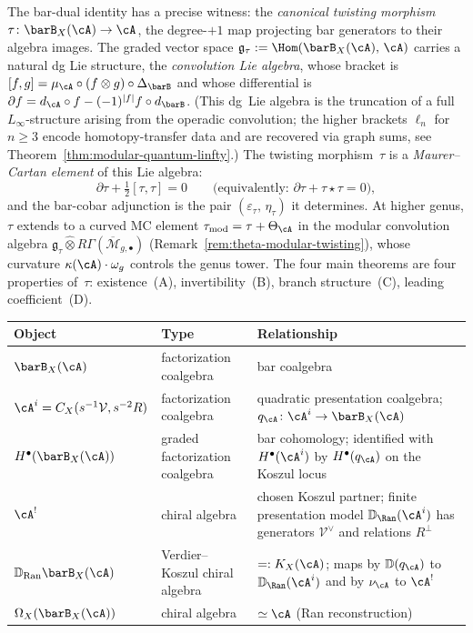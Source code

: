 \begin{convention}
The bar-dual identity has a precise witness: the \emph{canonical
twisting morphism}
$\tau \colon \barB_X(\cA) \to \cA$,
the degree-$+1$ map projecting bar generators to their algebra
images. The graded vector space
$\mathfrak{g}_\tau := \Hom(\barB_X(\cA),\, \cA)$ carries a
natural dg Lie structure, the \emph{convolution Lie algebra}, whose
bracket is $[f, g] = \mu_\cA \circ (f \otimes g) \circ
\Delta_{\barB}$ and whose differential is
$\partial f = d_\cA \circ f - (-1)^{|f|} f \circ d_{\barB}$.
(This dg~Lie algebra is the truncation of a full $L_\infty$-structure
arising from the operadic convolution; the higher brackets
$\ell_n$ for $n \ge 3$ encode homotopy-transfer data and are
recovered via graph sums, see
Theorem~\ref{thm:modular-quantum-linfty}.)
The twisting morphism~$\tau$ is a \emph{Maurer--Cartan element}
of this Lie algebra:
\[
\partial\tau + \tfrac{1}{2}[\tau, \tau] = 0
\qquad
\bigl(\text{equivalently: } \partial\tau + \tau \star \tau = 0\bigr),
\]
and the bar-cobar adjunction is the pair
$(\varepsilon_\tau,\, \eta_\tau)$ it determines.
At higher genus, $\tau$ extends to a curved MC element
$\tau_{\mathrm{mod}} = \tau + \Theta_\cA$
in the modular convolution algebra
$\mathfrak{g}_\tau \widehat{\otimes} R\Gamma(\overline{\mathcal{M}}_{g,\bullet})$
(Remark~\ref{rem:theta-modular-twisting}), whose curvature
$\kappa(\cA)\cdot\omega_g$ controls the genus tower.
The four main theorems are four properties of~$\tau$:
existence~(A), invertibility~(B), branch structure~(C),
leading coefficient~(D).

\smallskip\noindent
\begin{center}
\small
\renewcommand{\arraystretch}{1.15}
\begin{tabular}{lll}
\textbf{Object} & \textbf{Type} & \textbf{Relationship} \\
\hline
$\barB_X(\cA)$ & factorization coalgebra
 & bar coalgebra \\[2pt]
$\cA^i=C_X(s^{-1}\mathcal V,s^{-2}R)$ & factorization coalgebra
 & quadratic presentation coalgebra; $q_\cA\colon\cA^i\to\barB_X(\cA)$
 \\[2pt]
$H^\bullet(\barB_X(\cA))$ & graded factorization coalgebra
 & bar cohomology; identified with $H^\bullet(\cA^i)$ by
   $H^\bullet(q_\cA)$ on the Koszul locus \\[2pt]
$\cA^!$ & chiral algebra
 & chosen Koszul partner; finite presentation model
   $\mathbb D_{\Ran}(\cA^i)$ has generators $\mathcal{V}^\vee$ and
   relations $R^\perp$ \\[2pt]
$\mathbb{D}_{\operatorname{Ran}}\barB_X(\cA)$
 & Verdier--Koszul chiral algebra
 & $=:K_X(\cA)$; maps by $\mathbb D(q_\cA)$ to
   $\mathbb D_{\Ran}(\cA^i)$ and by $\nu_\cA$ to $\cA^!$ \\[2pt]
$\Omega_X(\barB_X(\cA))$ & chiral algebra
 & $\simeq \cA$ (Ran reconstruction)
\end{tabular}
\end{center}
\end{convention}

